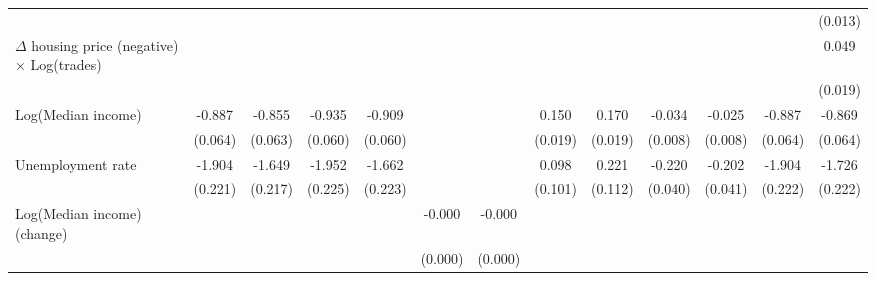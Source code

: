 \begin{sidewaystable}[htbp]
\begin{tabular}{l*{12}{c}}
                    &                    &                    &                    &                    &                    &                    &                    &                    &                    &                    &                    &     (0.013)        \\
$\Delta$ housing price (negative) $\times$ Log(trades)&                    &                    &                    &                    &                    &                    &                    &                    &                    &                    &                    &       0.049\sym{*} \\
                    &                    &                    &                    &                    &                    &                    &                    &                    &                    &                    &                    &     (0.019)        \\
Log(Median income)  &      -0.887\sym{**}&      -0.855\sym{**}&      -0.935\sym{**}&      -0.909\sym{**}&                    &                    &       0.150\sym{**}&       0.170\sym{**}&      -0.034\sym{**}&      -0.025\sym{**}&      -0.887\sym{**}&      -0.869\sym{**}\\
                    &     (0.064)        &     (0.063)        &     (0.060)        &     (0.060)        &                    &                    &     (0.019)        &     (0.019)        &     (0.008)        &     (0.008)        &     (0.064)        &     (0.064)        \\
Unemployment rate   &      -1.904\sym{**}&      -1.649\sym{**}&      -1.952\sym{**}&      -1.662\sym{**}&                    &                    &       0.098        &       0.221\sym{*} &      -0.220\sym{**}&      -0.202\sym{**}&      -1.904\sym{**}&      -1.726\sym{**}\\
                    &     (0.221)        &     (0.217)        &     (0.225)        &     (0.223)        &                    &                    &     (0.101)        &     (0.112)        &     (0.040)        &     (0.041)        &     (0.222)        &     (0.222)        \\
Log(Median income) (change)&                    &                    &                    &                    &      -0.000\sym{**}&      -0.000\sym{**}&                    &                    &                    &                    &                    &                    \\
                    &                    &                    &                    &                    &     (0.000)        &     (0.000)        &                    &                    &                    &                    &                    &                    \\

\end{tabular}
\end{sidewaystable}
